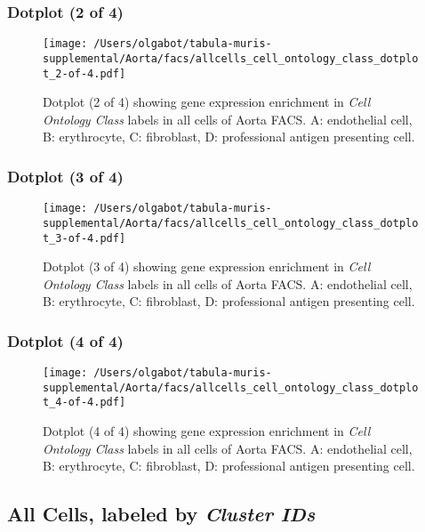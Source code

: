 \clearpage

\subsubsection{Dotplot (2 of 4)}
\begin{figure}[h]
\centering
\texttt{[image: /Users/olgabot/tabula-muris-supplemental/Aorta/facs/allcells\_cell\_ontology\_class\_dotplot\_2-of-4.pdf]}

\caption{ Dotplot (2 of 4)  showing gene expression enrichment in \emph{Cell Ontology Class} labels in all cells of Aorta FACS. A: endothelial cell, B: erythrocyte, C: fibroblast, D: professional antigen presenting cell.}
\end{figure}


\clearpage

\subsubsection{Dotplot (3 of 4)}
\begin{figure}[h]
\centering
\texttt{[image: /Users/olgabot/tabula-muris-supplemental/Aorta/facs/allcells\_cell\_ontology\_class\_dotplot\_3-of-4.pdf]}

\caption{ Dotplot (3 of 4)  showing gene expression enrichment in \emph{Cell Ontology Class} labels in all cells of Aorta FACS. A: endothelial cell, B: erythrocyte, C: fibroblast, D: professional antigen presenting cell.}
\end{figure}


\clearpage

\subsubsection{Dotplot (4 of 4)}
\begin{figure}[h]
\centering
\texttt{[image: /Users/olgabot/tabula-muris-supplemental/Aorta/facs/allcells\_cell\_ontology\_class\_dotplot\_4-of-4.pdf]}

\caption{ Dotplot (4 of 4)  showing gene expression enrichment in \emph{Cell Ontology Class} labels in all cells of Aorta FACS. A: endothelial cell, B: erythrocyte, C: fibroblast, D: professional antigen presenting cell.}
\end{figure}


\clearpage

\subsection{All Cells, labeled by \emph{Cluster IDs}}
